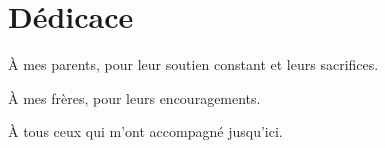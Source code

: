 \chapter*{Dédicace}
\thispagestyle{plain}

\vspace*{2cm}

\begin{flushright}
\begin{minipage}{0.72\linewidth}
\itshape

À mes parents, pour leur soutien constant et leurs sacrifices.

\vspace{0.8em}

À mes frères, pour leurs encouragements.

\vspace{0.8em}

À tous ceux qui m'ont accompagné jusqu'ici.

\end{minipage}
\end{flushright}
